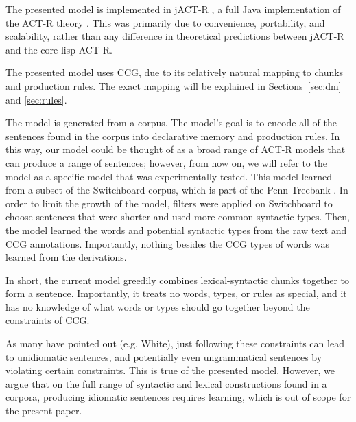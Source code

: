 The presented model is implemented in jACT-R \citep{jactr}, a full Java implementation of the ACT-R theory \citep{actr}. This was primarily due to convenience, portability, and scalability, rather than any difference in theoretical predictions between jACT-R and the core lisp ACT-R. 

The presented model uses CCG, due to its relatively natural mapping to chunks and production rules. The exact mapping will be explained in Sections~\ref{sec:dm} and \ref{sec:rules}.

The model is generated from a corpus. The model's goal is to encode all of the sentences found in the corpus into declarative memory and production rules. In this way, our model could be thought of as a broad range of ACT-R models that can produce a range of sentences; however, from now on, we will refer to the model as a specific model that was experimentally tested. This model learned from a subset of the Switchboard corpus, which is part of the Penn Treebank \cite{treebank}. In order to limit the growth of the model, filters were applied on Switchboard to choose sentences that were shorter and used more common syntactic types. Then, the model learned the words and potential syntactic types from the raw text and CCG annotations. Importantly, nothing besides the CCG types of words was learned from the derivations.

In short, the current model greedily combines lexical-syntactic chunks together to form a sentence. Importantly, it treats no words, types, or rules as special, and it has no knowledge of what words or types should go together beyond the constraints of CCG. 

As many have pointed out (e.g. White), just following these constraints can lead to unidiomatic sentences, and potentially even ungrammatical sentences by violating certain constraints. This is true of the presented model. However, we argue that on the full range of syntactic and lexical constructions found in a corpora, producing idiomatic sentences requires learning, which is out of scope for the present paper. 

